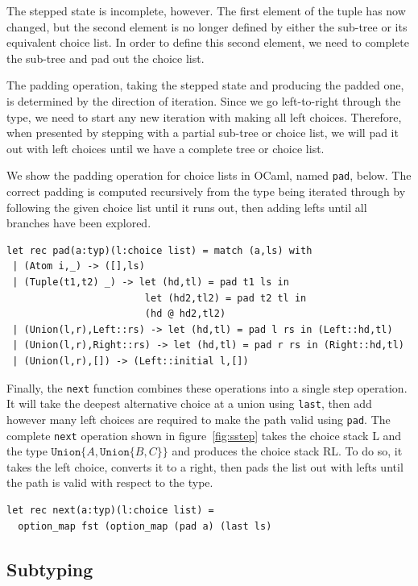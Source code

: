\documentclass[a4paper,english]{lipics-v2019}
\newcommand{\xt}[1]{\texttt{#1}}
\newcommand{\union}[2]{\xt{Union\{}#1,#2\xt{\}}}
\begin{document}
The stepped state is incomplete, however. The first element of the tuple has
now changed, but the second element is no longer defined by either the
sub-tree or its equivalent choice list. In order to define this second
element, we need to complete the sub-tree and pad out the choice list.

The padding operation, taking the stepped state and producing the padded one, is determined
by the direction of iteration. Since we go left-to-right through the type, we need to start
any new iteration with making all left choices. Therefore, when presented by stepping with
a partial sub-tree or choice list, we will pad it out with left choices until we have a complete
tree or choice list.

We show the padding operation for choice lists in OCaml, named
\verb|pad|, below.  The correct padding is computed recursively from
the type being iterated through by following the given choice list until it
runs out, then adding lefts until all branches have been explored.

\begin{lstlisting}
let rec pad(a:typ)(l:choice list) = match (a,ls) with
 | (Atom i,_) -> ([],ls)
 | (Tuple(t1,t2) _) -> let (hd,tl) = pad t1 ls in
                        let (hd2,tl2) = pad t2 tl in
                        (hd @ hd2,tl2)
 | (Union(l,r),Left::rs) -> let (hd,tl) = pad l rs in (Left::hd,tl)
 | (Union(l,r),Right::rs) -> let (hd,tl) = pad r rs in (Right::hd,tl)
 | (Union(l,r),[]) -> (Left::initial l,[])
\end{lstlisting}


Finally, the \verb|next| function combines these operations into
a single step operation. It will take the deepest alternative choice
at a union using \verb|last|, then add however many left
choices are required to make the path valid using \verb|pad|. The
complete \verb|next| operation shown in figure~\ref{fig:sstep} takes
the choice stack L and the type $\union{A}{\union{B}{C}}$ and produces the
choice stack RL. To do so, it takes the left choice, converts it to a right,
then pads the list out with lefts until the path is valid with respect to the 
type.

\begin{lstlisting}
let rec next(a:typ)(l:choice list) =
  option_map fst (option_map (pad a) (last ls)
\end{lstlisting}


\subsection{Subtyping}
\end{document}
